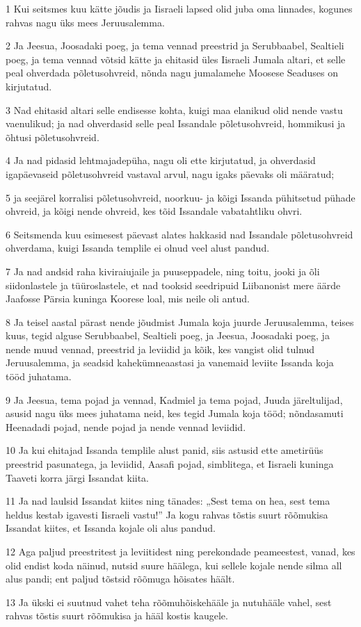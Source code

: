 \par 1 Kui seitsmes kuu kätte jõudis ja Iisraeli lapsed olid juba oma linnades, kogunes rahvas nagu üks mees Jeruusalemma.
\par 2 Ja Jeesua, Joosadaki poeg, ja tema vennad preestrid ja Serubbaabel, Sealtieli poeg, ja tema vennad võtsid kätte ja ehitasid üles Iisraeli Jumala altari, et selle peal ohverdada põletusohvreid, nõnda nagu jumalamehe Moosese Seaduses on kirjutatud.
\par 3 Nad ehitasid altari selle endisesse kohta, kuigi maa elanikud olid nende vastu vaenulikud; ja nad ohverdasid selle peal Issandale põletusohvreid, hommikusi ja õhtusi põletusohvreid.
\par 4 Ja nad pidasid lehtmajadepüha, nagu oli ette kirjutatud, ja ohverdasid igapäevaseid põletusohvreid vastaval arvul, nagu igaks päevaks oli määratud;
\par 5 ja seejärel korralisi põletusohvreid, noorkuu- ja kõigi Issanda pühitsetud pühade ohvreid, ja kõigi nende ohvreid, kes tõid Issandale vabatahtliku ohvri.
\par 6 Seitsmenda kuu esimesest päevast alates hakkasid nad Issandale põletusohvreid ohverdama, kuigi Issanda templile ei olnud veel alust pandud.
\par 7 Ja nad andsid raha kiviraiujaile ja puuseppadele, ning toitu, jooki ja õli siidonlastele ja tüüroslastele, et nad tooksid seedripuid Liibanonist mere äärde Jaafosse Pärsia kuninga Koorese loal, mis neile oli antud.
\par 8 Ja teisel aastal pärast nende jõudmist Jumala koja juurde Jeruusalemma, teises kuus, tegid alguse Serubbaabel, Sealtieli poeg, ja Jeesua, Joosadaki poeg, ja nende muud vennad, preestrid ja leviidid ja kõik, kes vangist olid tulnud Jeruusalemma, ja seadsid kahekümneaastasi ja vanemaid leviite Issanda koja tööd juhatama.
\par 9 Ja Jeesua, tema pojad ja vennad, Kadmiel ja tema pojad, Juuda järeltulijad, asusid nagu üks mees juhatama neid, kes tegid Jumala koja tööd; nõndasamuti Heenadadi pojad, nende pojad ja nende vennad leviidid.
\par 10 Ja kui ehitajad Issanda templile alust panid, siis astusid ette ametirüüs preestrid pasunatega, ja leviidid, Aasafi pojad, simblitega, et Iisraeli kuninga Taaveti korra järgi Issandat kiita.
\par 11 Ja nad laulsid Issandat kiites ning tänades: „Sest tema on hea, sest tema heldus kestab igavesti Iisraeli vastu!” Ja kogu rahvas tõstis suurt rõõmukisa Issandat kiites, et Issanda kojale oli alus pandud.
\par 12 Aga paljud preestritest ja leviitidest ning perekondade peameestest, vanad, kes olid endist koda näinud, nutsid suure häälega, kui sellele kojale nende silma all alus pandi; ent paljud tõstsid rõõmuga hõisates häält.
\par 13 Ja ükski ei suutnud vahet teha rõõmuhõiskehääle ja nutuhääle vahel, sest rahvas tõstis suurt rõõmukisa ja hääl kostis kaugele.

